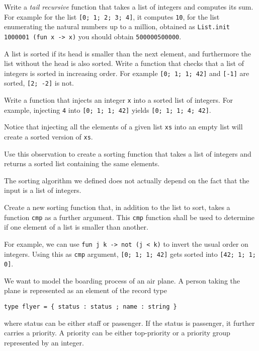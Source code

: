 \documentclass[arhiv]{../izpit}
\begin{document}

\naloga

Write a \emph{tail recursive} function that takes a list of integers and
computes its sum. For example for the list \verb|[0; 1; 2; 3; 4]|, it computes
\verb|10|, for the list enumerating the natural numbers up to a million, obtained as \verb|List.init 1000001 (fun x -> x)| you should obtain \verb|500000500000|.

\naloga

A list is sorted if its head is smaller than the next element, and furthermore the list without the head is also sorted. Write a function that checks that a list of integers is sorted in increasing order. For example \verb|[0; 1; 1; 42]| and \verb|[-1]| are sorted, \verb|[2; -2]| is not.

\naloga

Write a function that injects an integer \verb|x| into a sorted list of integers. For example, injecting \verb|4| into \verb|[0; 1; 1; 42]| yields  \verb|[0; 1; 1; 4; 42]|.

Notice that injecting all the elements of a given list \verb|xs| into an empty list will create a sorted version of \verb|xs|.

Use this observation to create a sorting function that takes a list of integers and returns a sorted list containing the same elements.

\naloga

The sorting algorithm we defined does not actually depend on the fact that the input is a list of integers.

Create a new sorting function that, in addition to the list to sort, takes a function \verb|cmp| as a further argument. This \verb|cmp| function shall be used to determine if one element of a list is smaller than another.

For example, we can use \verb|fun j k -> not (j < k)| to invert the usual order on integers. Using this as \verb|cmp| argument, \verb|[0; 1; 1; 42]| gets sorted into \verb|[42; 1; 1; 0]|.

\naloga

We want to model the boarding process of an air plane. A person taking the plane is represented as an element of the record type
%
\begin{verbatim}
type flyer = { status : status ; name : string }
\end{verbatim}
%
where status can be either staff or passenger. If the status is passenger, it further carries a priority. A priority can be either top-priority or a priority group represented by an integer.
\end{document}
